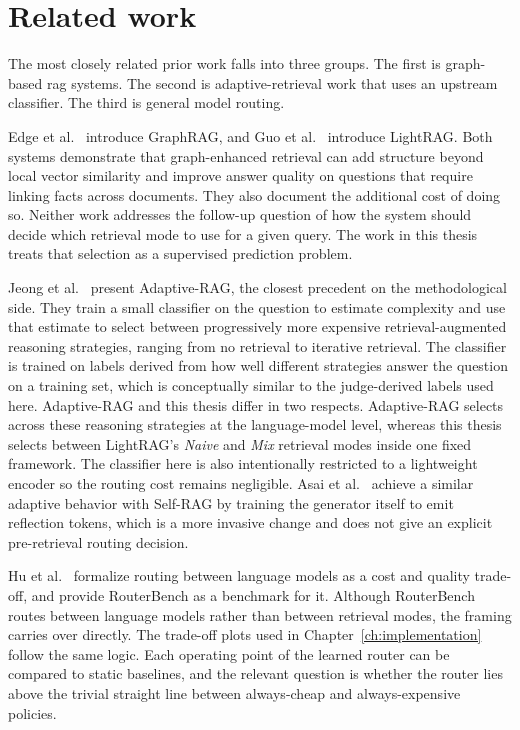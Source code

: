 \documentclass[english, bibtex]{kththesis}               %
\numberwithin{listing}{chapter}
\begin{document}
\section{Related work}
\label{sec:relatedWork}

The most closely related prior work falls into three groups. The first is graph-based \gls{rag} systems. The second is adaptive-retrieval work that uses an upstream classifier. The third is general model routing.

Edge et al.\ \cite{edge2024graphrag} introduce GraphRAG, and Guo et al.\ \cite{lightrag2024} introduce LightRAG. Both systems demonstrate that graph-enhanced retrieval can add structure beyond local vector similarity and improve answer quality on questions that require linking facts across documents. They also document the additional cost of doing so. Neither work addresses the follow-up question of how the system should decide which retrieval mode to use for a given query. The work in this thesis treats that selection as a supervised prediction problem.

Jeong et al.\ \cite{jeong2024adaptiverag} present Adaptive-RAG, the closest precedent on the methodological side. They train a small classifier on the question to estimate complexity and use that estimate to select between progressively more expensive retrieval-augmented reasoning strategies, ranging from no retrieval to iterative retrieval. The classifier is trained on labels derived from how well different strategies answer the question on a training set, which is conceptually similar to the judge-derived labels used here. Adaptive-RAG and this thesis differ in two respects. Adaptive-RAG selects across these reasoning strategies at the language-model level, whereas this thesis selects between LightRAG's \emph{Naive} and \emph{Mix} retrieval modes inside one fixed framework. The classifier here is also intentionally restricted to a lightweight encoder so the routing cost remains negligible. Asai et al.\ \cite{asai2023selfrag} achieve a similar adaptive behavior with Self-RAG by training the generator itself to emit reflection tokens, which is a more invasive change and does not give an explicit pre-retrieval routing decision.

Hu et al.\ \cite{hu2024routerbench} formalize routing between language models as a cost and quality trade-off, and provide RouterBench as a benchmark for it. Although RouterBench routes between language models rather than between retrieval modes, the framing carries over directly. The trade-off plots used in Chapter~\ref{ch:implementation} follow the same logic. Each operating point of the learned router can be compared to static baselines, and the relevant question is whether the router lies above the trivial straight line between always-cheap and always-expensive policies.
\end{document}
